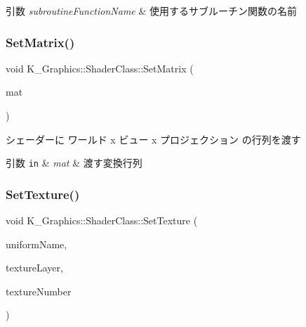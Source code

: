 \begin{DoxyParams}{引数}
{\em subroutine\+Function\+Name} & 使用するサブルーチン関数の名前 \\
\hline
\end{DoxyParams}
\mbox{\label{class_k___graphics_1_1_shader_class_a8aa0f7eb6c2443df15d483653f9401e3}} 
\subsubsection{\texorpdfstring{Set\+Matrix()}{SetMatrix()}}
{\footnotesize\ttfamily void K\+\_\+\+Graphics\+::\+Shader\+Class\+::\+Set\+Matrix (\begin{DoxyParamCaption}\item[{const \mbox{\hyperlink{namespace_k___math_a345271af9d32dff2c964bc679b13b45c}{K\+\_\+\+Math\+::\+Matrix4x4}} \&}]{mat }\end{DoxyParamCaption})}



シェーダーに ワールド x ビュー x プロジェクション の行列を渡す 


\begin{DoxyParams}[1]{引数}
\mbox{\tt in}  & {\em mat} & 渡す変換行列 \\
\hline
\end{DoxyParams}
\mbox{\label{class_k___graphics_1_1_shader_class_a9d8fd3a0ab36010e685eecd735e6d296}} 
\subsubsection{\texorpdfstring{Set\+Texture()}{SetTexture()}}
{\footnotesize\ttfamily void K\+\_\+\+Graphics\+::\+Shader\+Class\+::\+Set\+Texture (\begin{DoxyParamCaption}\item[{const std\+::string \&}]{uniform\+Name,  }\item[{G\+Luint}]{texture\+Layer,  }\item[{G\+Luint}]{texture\+Number }\end{DoxyParamCaption})}



